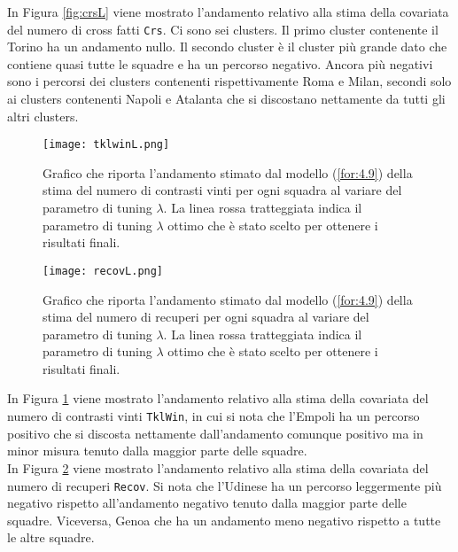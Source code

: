 In Figura \ref{fig:crsL} viene mostrato l'andamento relativo alla stima della covariata del numero di cross fatti \texttt{Crs}. Ci sono sei clusters. Il primo cluster contenente il Torino ha un andamento nullo. Il secondo cluster è il cluster più grande dato che contiene quasi tutte le squadre e ha un percorso negativo. Ancora più negativi sono i percorsi dei clusters contenenti rispettivamente Roma e Milan, secondi solo ai clusters contenenti Napoli e Atalanta che si discostano nettamente da tutti gli altri clusters.

\begin{figure}[htbp]
	\begin{center}
		\texttt{[image: tklwinL.png]}
		\caption{Grafico che riporta l'andamento stimato dal modello (\ref{for:4.9}) della stima del numero di contrasti vinti per ogni squadra al variare del parametro di tuning $\lambda$. La linea rossa tratteggiata indica il parametro di tuning $\lambda$ ottimo che è stato scelto per ottenere i risultati finali.} \label{fig:tklwinL}
	\end{center}
\end{figure}

\begin{figure}[htbp]
	\begin{center}
		\texttt{[image: recovL.png]}
		\caption{Grafico che riporta l'andamento stimato dal modello (\ref{for:4.9}) della stima del numero di recuperi per ogni squadra al variare del parametro di tuning $\lambda$. La linea rossa tratteggiata indica il parametro di tuning $\lambda$ ottimo che è stato scelto per ottenere i risultati finali.} \label{fig:recovL}
	\end{center}
\end{figure}
In Figura \ref{fig:tklwinL} viene mostrato l'andamento relativo alla stima della covariata del numero di contrasti vinti \texttt{TklWin}, in cui si nota che l'Empoli ha un percorso positivo che si discosta nettamente dall'andamento comunque positivo ma in minor misura tenuto dalla maggior parte delle squadre.\\
In Figura \ref{fig:recovL} viene mostrato l'andamento relativo alla stima della covariata del numero di recuperi \texttt{Recov}. Si nota che l'Udinese ha un percorso leggermente più negativo rispetto all'andamento negativo tenuto dalla maggior parte delle squadre. Viceversa, Genoa che ha un andamento meno negativo rispetto a tutte le altre squadre.\\


